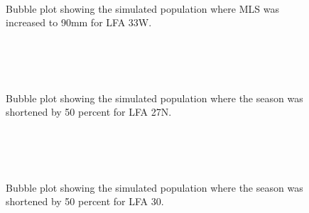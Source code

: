 \documentclass[11pt]{article}
\newcommand{\e}{\string~/bio.data/bio.lobster/figures/LFA2733Framework2018/} %
\begin{document}
    \begin{figure}
    \centering
                \\
                \\
                \\
        
         \caption{Bubble plot showing the simulated population where MLS was increased to 90mm for LFA 33W.}
    \end{figure}
    


    \begin{figure}
    \centering
                \\
                \\
                \\
        
         \caption{Bubble plot showing the simulated population where the season was shortened by 50 percent for LFA 27N.}
    \end{figure}
    
    \begin{figure}
    \centering
                \\
                \\
                \\
        
         \caption{Bubble plot showing the simulated population where the season was shortened by 50 percent  for LFA 30.}
    \end{figure}
    
\end{document}
